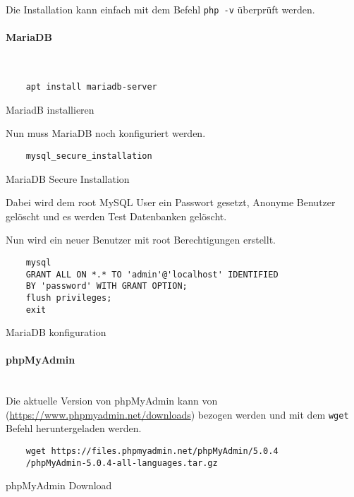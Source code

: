 Die Installation kann einfach mit dem Befehl \verb|php -v| überprüft werden.

\paragraph{MariaDB}\mbox{}\\

\begin{listing}[H]
  \begin{verbatim}
    apt install mariadb-server
  \end{verbatim}
  \caption{MariadB installieren}
\end{listing}

Nun muss MariaDB noch konfiguriert werden.

\begin{listing}[H]
  \begin{verbatim}
    mysql_secure_installation
  \end{verbatim}
  \caption{MariaDB Secure Installation}
\end{listing}

Dabei wird dem root MySQL User ein Passwort gesetzt, Anonyme Benutzer gelöscht
und es werden Test Datenbanken gelöscht.

Nun wird ein neuer Benutzer mit root Berechtigungen erstellt.

\begin{listing}[H]
  \begin{verbatim}
    mysql
    GRANT ALL ON *.* TO 'admin'@'localhost' IDENTIFIED 
    BY 'password' WITH GRANT OPTION;
    flush privileges;
    exit
  \end{verbatim}
  \caption{MariaDB konfiguration}
\end{listing}

\paragraph{phpMyAdmin}\mbox{}\\

Die aktuelle Version von phpMyAdmin kann von
(\url{https://www.phpmyadmin.net/downloads}) bezogen werden und mit dem
\verb|wget| Befehl heruntergeladen werden.

\begin{listing}[H]
  \begin{verbatim}
    wget https://files.phpmyadmin.net/phpMyAdmin/5.0.4
    /phpMyAdmin-5.0.4-all-languages.tar.gz
  \end{verbatim}
  \caption{phpMyAdmin Download}
\end{listing}

